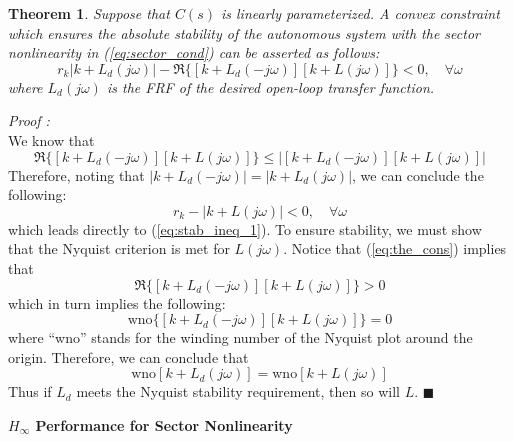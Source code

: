 \documentclass[12pt]{article}
\newtheorem{theorem}{Theorem}
\begin{document}
\begin{theorem}
Suppose that $C(s)$ is linearly parameterized. A convex constraint which ensures the absolute stability of the autonomous system with the sector nonlinearity in (\ref{eq:sector_cond}) can be asserted as follows:
\begin{equation} \label{eq:the_cons}
r_k|k+L_d(j\omega)|  -  \Re \{[k+L_d(-j\omega)][k+L(j\omega)]\} < 0, \quad \forall \omega
\end{equation}
where $L_d(j\omega)$ is the FRF of the desired open-loop transfer function.
\end{theorem}



{\it Proof :}\\
We know that
\begin{equation}
\Re \{[k+L_d(-j\omega)][k+L(j\omega)]\} \leq |[k+L_d(-j\omega)][k+L(j\omega)]|
\end{equation}
Therefore, noting that $|k+L_d(-j\omega)| = |k+L_d(j\omega)|$, we can conclude the following:
\begin{equation}
r_k -  |k+L(j\omega)| < 0, \quad \forall \omega
\end{equation}
which leads directly to (\ref{eq:stab_ineq_1}). To ensure stability, we must show that the Nyquist criterion is met for $L(j\omega)$. Notice that (\ref{eq:the_cons}) implies that
\begin{equation}
\Re \{[k+L_d(-j\omega)][k+L(j\omega)]\} > 0
\end{equation}
which in turn implies the following:
\begin{equation}
\mbox{wno} \{[k+L_d(-j\omega)][k+L(j\omega)]\} = 0
\end{equation}
where ``wno'' stands for the winding number of the Nyquist plot around the origin. Therefore, we can conclude that 
\begin{equation}
\mbox{wno} [k+L_d(j\omega)] = \mbox{wno} [k+L(j\omega)] 
\end{equation}
Thus if $L_d$ meets the Nyquist stability requirement, then so will $L$.
 {\hfill \ensuremath{\blacksquare}}

\vspace{1cm}
\textbf{$H_\infty$ Performance for Sector Nonlinearity}
\end{document}
